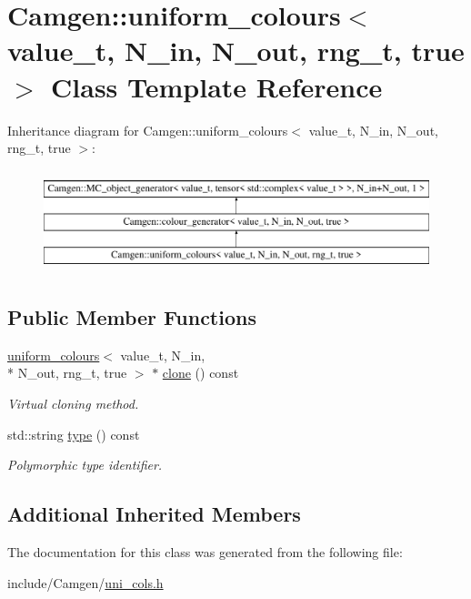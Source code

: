\hypertarget{a00545}{\section{Camgen\-:\-:uniform\-\_\-colours$<$ value\-\_\-t, N\-\_\-in, N\-\_\-out, rng\-\_\-t, true $>$ Class Template Reference}
\label{a00545}
}
Inheritance diagram for Camgen\-:\-:uniform\-\_\-colours$<$ value\-\_\-t, N\-\_\-in, N\-\_\-out, rng\-\_\-t, true $>$\-:\begin{figure}[H]
\begin{center}
\leavevmode
\includegraphics[height=3.000000cm]{a00545}
\end{center}
\end{figure}
\subsection*{Public Member Functions}
\begin{DoxyCompactItemize}
\item 
\hypertarget{a00545_a46844036645e70b5c10966646412520e}{\hyperlink{a00543}{uniform\-\_\-colours}$<$ value\-\_\-t, N\-\_\-in, \\*
N\-\_\-out, rng\-\_\-t, true $>$ $\ast$ \hyperlink{a00545_a46844036645e70b5c10966646412520e}{clone} () const }\label{a00545_a46844036645e70b5c10966646412520e}

\begin{DoxyCompactList}\small\item\em Virtual cloning method. \end{DoxyCompactList}\item 
\hypertarget{a00545_afa1f3cc1a72f983c45a615690a6dc60f}{std\-::string \hyperlink{a00545_afa1f3cc1a72f983c45a615690a6dc60f}{type} () const }\label{a00545_afa1f3cc1a72f983c45a615690a6dc60f}

\begin{DoxyCompactList}\small\item\em Polymorphic type identifier. \end{DoxyCompactList}\end{DoxyCompactItemize}
\subsection*{Additional Inherited Members}


The documentation for this class was generated from the following file\-:\begin{DoxyCompactItemize}
\item 
include/\-Camgen/\hyperlink{a00794}{uni\-\_\-cols.\-h}\end{DoxyCompactItemize}

